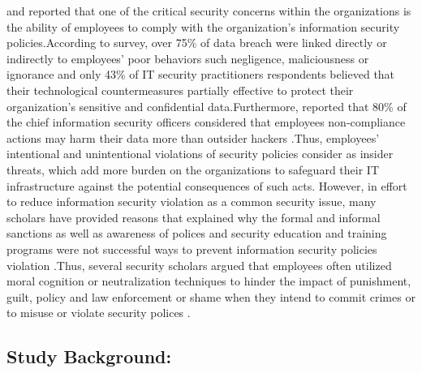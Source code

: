 \citet{Siponen2010} and \cite{Puhakainen2010} reported that one of the critical security concerns within the organizations is the ability of employees to comply with the organization's information security policies.According to \citet{PonemonInstitute2012} survey, over 75\% of data breach were linked directly or indirectly to employees' poor behaviors such negligence, maliciousness or ignorance and only 43\% of IT security practitioners respondents believed that their technological countermeasures partially effective to protect their organization's sensitive and confidential data.Furthermore, \cite{Barlow2013} reported that 80\% of the chief information security officers considered that employees non-compliance actions may harm their data more than outsider hackers .Thus, employees' intentional and unintentional violations of security policies consider as insider threats, which add more burden on the organizations to safeguard their IT infrastructure against the potential consequences of such acts. 
However, in effort to reduce information security violation as a common security issue, many scholars have provided reasons that explained why the formal and informal sanctions as well as awareness of polices and security education and training programs were not successful ways to prevent information security policies violation \cite{Siponen2010,Darcy,Chen2012,}.Thus, several security scholars argued that employees often utilized moral cognition or neutralization techniques to hinder the impact of punishment, guilt, policy and law enforcement or shame when they intend to commit crimes or to misuse or violate security polices \cite{Siponen2010,Barlow2013,Teh2015,Sykes1957,Kim2014,Hinduja2007,Ingram2008}.\

\subsection{Study Background:}

